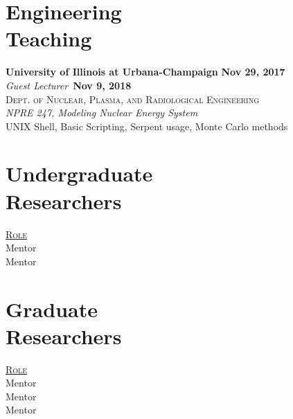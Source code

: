 \documentclass[margin,line]{resume}
\begin{document}
\begin{resume}
    \section{\mysidestyle Engineering\\Teaching}
    \textbf{University of Illinois at Urbana-Champaign} \hfill \textbf{Nov 29, 2017}\\
    \textsl{Guest Lecturer}~\hfill \textbf{Nov 9, 2018}\\
    \textsc{Dept. of Nuclear, Plasma, and Radiological Engineering}\\ 
               \textsl{NPRE 247, Modeling Nuclear Energy System}\\
               UNIX Shell, Basic Scripting, Serpent usage, Monte Carlo methods
               \vspace{2mm}
    \section{\mysidestyle Undergraduate\\Researchers}
    \hfill\textsc{\underline{Role}}\\
    \hfill Mentor\\
    \hfill Mentor\\
    \section{\mysidestyle Graduate\\Researchers}
    \hfill\textsc{\underline{Role}}\\
    \hfill Mentor\\
    \hfill Mentor\\
    \hfill Mentor\\

\end{resume}
\end{document}
